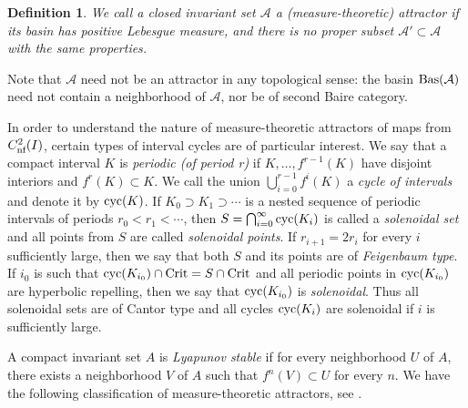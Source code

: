 \documentclass[12pt, psamsfonts, reqno]{amsart}
\newtheorem{definition}[theorem]{Definition}
\begin{document}
\begin{definition}\label{def:attractor}
We call a closed invariant set ${{\mathcal A}}$ a {\em (measure-theoretic)
attractor} if its basin has positive Lebesgue measure, and there
is no proper subset ${{\mathcal A}}' \subset {{\mathcal A}}$ with the same properties.
\end{definition}

Note that ${{\mathcal A}}$ need not be an attractor in any
topological sense: the basin ${\mathop{\rm Bas}\nolimits}({{\mathcal A}})$ need not contain a
neighborhood of ${{\mathcal A}}$, nor be of second Baire category.

In order to understand the nature of measure-theoretic attractors
of maps from ${C^2_{\text{\rm nf}}}(I)$, certain types of interval cycles are of
particular interest. We say that a compact interval $K$ is
\emph{periodic (of period r)} if
$K,\ldots, f^{r-1}(K)$ have disjoint interiors and $f^r(K)\subset K$.
We call the union $\bigcup_{i=0}^{r-1}f^i(K)$ a \emph{cycle of
intervals} and denote it by ${\mathop{\rm cyc}\nolimits}(K)$.
If $K_0\supset K_1\supset \cdots$ is a nested sequence of
periodic intervals of periods $r_0<r_1<\cdots$, then
$S=\bigcap_{i=0}^\infty {\mathop{\rm cyc}\nolimits}(K_i)$ is called a \emph{solenoidal
set} and all points from $S$ are called \emph{solenoidal points}.
If $r_{i+1}=2r_i$ for every $i$ sufficiently large, then we say
that both $S$ and its points are of \emph{Feigenbaum type}\label{feig}. If
$i_0$ is such that ${\mathop{\rm cyc}\nolimits}(K_{i_0})\cap {\mathop{\rm Crit}\nolimits} = S\cap {\mathop{\rm Crit}\nolimits}$ and all
periodic points in ${\mathop{\rm cyc}\nolimits}(K_{i_0})$ are hyperbolic repelling, then
we say that ${\mathop{\rm cyc}\nolimits}(K_{i_0})$ is \emph{solenoidal}.
Thus all solenoidal sets are of Cantor type and all cycles
${\mathop{\rm cyc}\nolimits}(K_i)$ are solenoidal if $i$ is sufficiently large.

A compact invariant set $A$ is \emph{Lyapunov stable} if for every
neighborhood $U$ of $A$, there exists a neighborhood $V$ of $A$
such that $f^n(V)\subset U$ for every $n$. We have the following
classification of measure-theoretic attractors, see
\cite{mane,keller,BL,Lypre,dMvS,vSV}.
\end{document}
